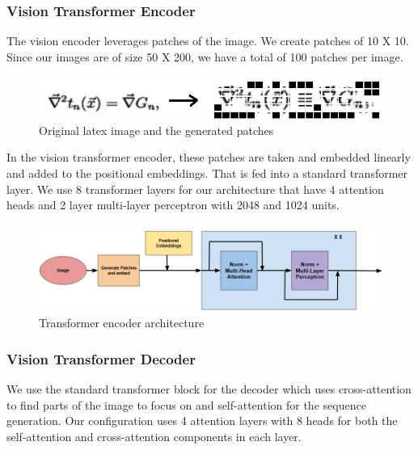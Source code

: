 \documentclass{article}
\begin{document}
\subsubsection{Vision Transformer Encoder}
The vision encoder leverages patches of the image. We create patches of 10 X 10. Since our images are of size 50 X 200, we have a total of 100 patches per image.
\begin{figure}[h]
	\centering \includegraphics[scale=0.3]{image_to_patches.png}
	\caption{Original latex image and the generated patches}
\end{figure}

In the vision transformer encoder, these patches are taken and embedded linearly and added to the positional embeddings. That is fed into a standard transformer layer. We use 8 transformer layers for our architecture that have 4 attention heads and 2 layer multi-layer perceptron with 2048 and 1024 units.

\begin{figure}[H]
	\centering \includegraphics[scale=0.5]{transformer_encoder.png}
	\caption{Transformer encoder architecture}
\end{figure}

\subsubsection{Vision Transformer Decoder}

We use the standard transformer block for the decoder which uses cross-attention to find parts of the image to focus on and self-attention for the sequence generation. Our configuration uses 4 attention layers with 8 heads for both the self-attention and cross-attention components in each layer.
\end{document}
